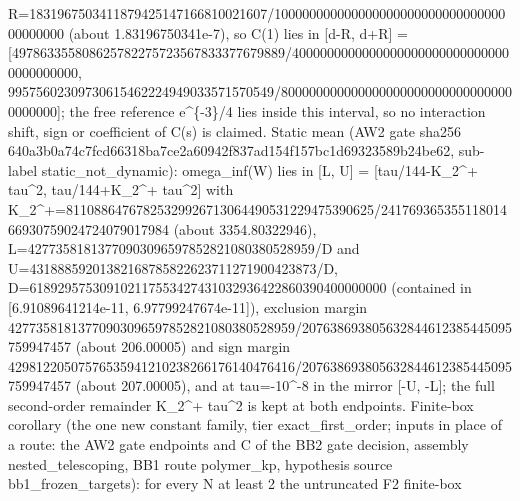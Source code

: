 \begin{gatequote}
R=1831967503411879425147166810021607/10000000000000000000000000000000000000000
(about 1.83196750341e-7), so C(1) lies in [d-R, d+R] =
[49786\allowbreak{}335580\allowbreak{}862578\allowbreak{}227572\allowbreak{}356783\allowbreak{}337767\allowbreak{}9889/4\allowbreak{}000000\allowbreak{}000000\allowbreak{}000000\allowbreak{}000000\allowbreak{}000000\allowbreak{}000000\allowbreak{}0000,
995756\allowbreak{}023097\allowbreak{}306154\allowbreak{}622249\allowbreak{}490335\allowbreak{}715705\allowbreak{}49/800\allowbreak{}000000\allowbreak{}000000\allowbreak{}000000\allowbreak{}000000\allowbreak{}000000\allowbreak{}000000\allowbreak{}0];
the free reference e\textasciicircum{}\{-3\}/4 lies inside this interval, so
no interaction shift, sign or coefficient of C(s) is claimed. Static mean (AW2
gate sha256 640a3b0a74c7fcd66318ba7ce2a60942f837ad154f157bc1d69323589b24be62,
sub-label static\_not\_dynamic): omega\_inf(W) lies in [L, U] =
[tau/144-K\_2\textasciicircum{}+ tau\textasciicircum{}2,
tau/144+K\_2\textasciicircum{}+ tau\textasciicircum{}2] with
K\_2\textasciicircum{}+=\allowbreak{}811088\allowbreak{}647678\allowbreak{}253299\allowbreak{}267130\allowbreak{}644905\allowbreak{}312294\allowbreak{}753906\allowbreak{}25/241\allowbreak{}769365\allowbreak{}355118\allowbreak{}014669\allowbreak{}307590\allowbreak{}247240\allowbreak{}790179\allowbreak{}84
(about 3354.80322946), L=42773581813770903096597852821080380528959/D and
U=43188859201382168785822623711271900423873/D,
D=618929575309102117553427431032936422860390400000000 (contained in
[6.91089641214e-11, 6.97799247674e-11]), exclusion margin
427735\allowbreak{}818137\allowbreak{}709030\allowbreak{}965978\allowbreak{}528210\allowbreak{}803805\allowbreak{}28959/\allowbreak{}207638\allowbreak{}693805\allowbreak{}632844\allowbreak{}612385\allowbreak{}445095\allowbreak{}759947\allowbreak{}457
(about 206.00005) and sign margin
429812\allowbreak{}205075\allowbreak{}765359\allowbreak{}412102\allowbreak{}382661\allowbreak{}761404\allowbreak{}76416/\allowbreak{}207638\allowbreak{}693805\allowbreak{}632844\allowbreak{}612385\allowbreak{}445095\allowbreak{}759947\allowbreak{}457
(about 207.00005), and at tau=-10\textasciicircum{}-8 in the mirror [-U, -L];
the full second-order remainder K\_2\textasciicircum{}+ tau\textasciicircum{}2
is kept at both endpoints. Finite-box corollary (the one new constant family,
tier exact\_first\_order; inputs in place of a route: the AW2 gate endpoints
and C\textquotesingle{} of the BB2 gate decision, assembly
nested\_telescoping, BB1 route polymer\_kp, hypothesis source
bb1\_frozen\_targets): for every N at least 2 the untruncated F2 finite-box

\end{gatequote}
